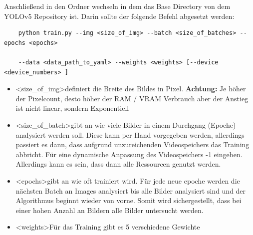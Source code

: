 Anschließend in den Ordner wechseln in dem das Base Directory von dem YOLOv5 Repository ist. Darin sollte der folgende Befehl abgesetzt werden:
\begin{verbatim}
    python train.py --img <size_of_img> --batch <size_of_batches> --epochs <epochs>
    
    --data <data_path_to_yaml> --weights <weights> [--device <device_numbers> ]
\end{verbatim}
\begin{itemize}
    \item \textless size\_of\_img\textgreater definiert die Breite des Bildes in Pixel. \textbf{Achtung:} Je höher der Pixelcount, desto höher der RAM / VRAM Verbrauch aber der Anstieg ist nicht linear, sondern Exponentiell
    \item \textless size\_of\_batch\textgreater gibt an wie viele Bilder in einem Durchgang (Epoche) analysiert werden soll. Diese kann per Hand vorgegeben werden, allerdings passiert es dann, dass aufgrund unzureichenden Videospeichers das Training abbricht. Für eine dynamische Anpassung des Videospeichers -1 eingeben. Allerdings kann es sein, dass dann alle Ressourcen genutzt werden.
    \item \textless epochs\textgreater gibt an wie oft trainiert wird. Für jede neue epoche werden die nächsten Batch an Images analysiert bis alle Bilder analysiert sind und der Algorithmus beginnt wieder von vorne. Somit wird sichergestellt, dass bei einer hohen Anzahl an Bildern alle Bilder untersucht werden.
    \item \textless weights\textgreater Für das Training gibt es 5 verschiedene Gewichte
\end{itemize}